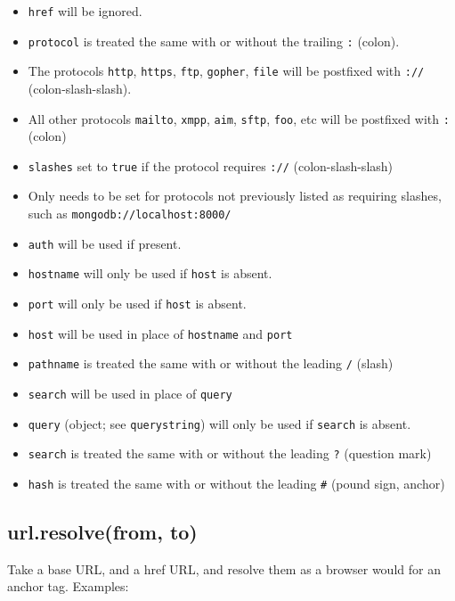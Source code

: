 \begin{itemize}
\itemsep1pt\parskip0pt
\item
  \texttt{href} will be ignored.
\item
  \texttt{protocol} is treated the same with or without the trailing
  \texttt{:} (colon).
\item
  The protocols \texttt{http}, \texttt{https}, \texttt{ftp},
  \texttt{gopher}, \texttt{file} will be postfixed with \texttt{://}
  (colon-slash-slash).
\item
  All other protocols \texttt{mailto}, \texttt{xmpp}, \texttt{aim},
  \texttt{sftp}, \texttt{foo}, etc will be postfixed with \texttt{:}
  (colon)
\item
  \texttt{slashes} set to \texttt{true} if the protocol requires
  \texttt{://} (colon-slash-slash)
\item
  Only needs to be set for protocols not previously listed as requiring
  slashes, such as \texttt{mongodb://localhost:8000/}
\item
  \texttt{auth} will be used if present.
\item
  \texttt{hostname} will only be used if \texttt{host} is absent.
\item
  \texttt{port} will only be used if \texttt{host} is absent.
\item
  \texttt{host} will be used in place of \texttt{hostname} and
  \texttt{port}
\item
  \texttt{pathname} is treated the same with or without the leading
  \texttt{/} (slash)
\item
  \texttt{search} will be used in place of \texttt{query}
\item
  \texttt{query} (object; see \texttt{querystring}) will only be used if
  \texttt{search} is absent.
\item
  \texttt{search} is treated the same with or without the leading
  \texttt{?} (question mark)
\item
  \texttt{hash} is treated the same with or without the leading
  \texttt{\#} (pound sign, anchor)
\end{itemize}

\subsection{url.resolve(from, to)}\label{url.resolvefrom-to}

Take a base URL, and a href URL, and resolve them as a browser would for
an anchor tag. Examples:

